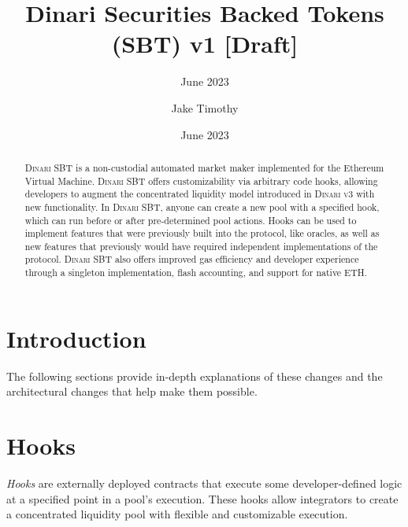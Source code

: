 \documentclass[sigconf,nonacm,prologue,table]{acmart}
\numberwithin{equation}{section}
\theoremstyle{definition}
\theoremstyle{remark}
\begin{document}
\title{Dinari Securities Backed Tokens (SBT) v1 [Draft]}
\subtitle{June 2023}
\date{June 2023}

\author{Jake Timothy}
\affiliation{}

\begin{teaserfigure}
\caption*{
    \hspace{\textwidth}
    }
\end{teaserfigure}

\renewcommand{\shortauthors}{Timothy}

\begin{abstract}

\textsc{Dinari SBT} is a non-custodial automated market maker implemented for the Ethereum Virtual Machine. \textsc{Dinari SBT} offers customizability via arbitrary code hooks, allowing developers to augment the concentrated liquidity model introduced in \textsc{Dinari v3} with new functionality. In \textsc{Dinari SBT}, anyone can create a new pool with a specified hook, which can run before or after pre-determined pool actions. Hooks can be used to implement features that were previously built into the protocol, like oracles, as well as new features that previously would have required independent implementations of the protocol. \textsc{Dinari SBT} also offers improved gas efficiency and developer experience through a singleton implementation, flash accounting, and support for native ETH.
\end{abstract}

\maketitle

\section{Introduction} \label{sec:introduction}


The following sections provide in-depth explanations of these changes and the architectural changes that help make them possible.

\section{Hooks} 
\label{sec:Hooks}

\emph{Hooks} are externally deployed contracts that execute some developer-defined logic at a specified point in a pool’s execution. These hooks allow integrators to create a concentrated liquidity pool with flexible and customizable execution.
\end{document}
